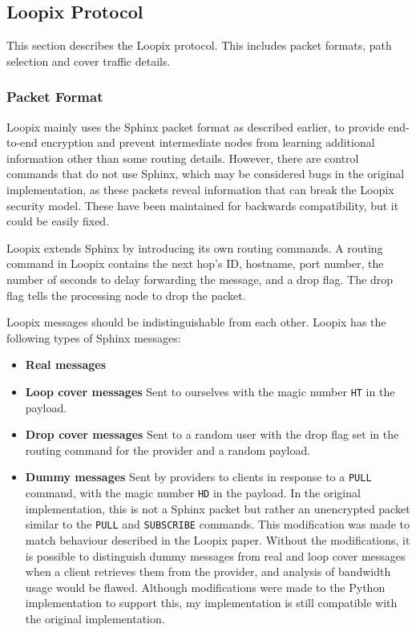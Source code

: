 \documentclass[final,dissertation.tex]{subfiles}
\begin{document}
%

\subsection{Loopix Protocol}

This section describes the Loopix protocol. This includes packet formats, path selection and cover traffic details.

\subsubsection{Packet Format}

Loopix mainly uses the Sphinx packet format as described earlier, to provide end-to-end encryption and prevent intermediate nodes from learning additional information other than some routing details. However, there are control commands that do not use Sphinx, which may be considered bugs in the original implementation, as these packets reveal information that can break the Loopix security model. These have been maintained for backwards compatibility, but it could be easily fixed.

Loopix extends Sphinx by introducing its own routing commands. A routing command in Loopix contains the next hop's ID, hostname, port number, the number of seconds to delay forwarding the message, and a drop flag. The drop flag tells the processing node to drop the packet.

Loopix messages should be indistinguishable from each other. Loopix has the following types of Sphinx messages: 

\begin{itemize}
	\item \textbf{Real messages}
	\item \textbf{Loop cover messages} Sent to ourselves with the magic number \verb|HT| in the payload.
	\item \textbf{Drop cover messages} Sent to a random user with the drop flag set in the routing command for the provider and a random payload.
	\item \textbf{Dummy messages} Sent by providers to clients in response to a \verb|PULL| command, with the magic number \verb|HD| in the payload. In the original implementation, this is not a Sphinx packet but rather an unencrypted packet similar to the \verb|PULL| and \verb|SUBSCRIBE| commands. This modification was made to match behaviour described in the Loopix paper. Without the modifications, it is possible to distinguish dummy messages from real and loop cover messages when a client retrieves them from the provider, and analysis of bandwidth usage would be flawed. Although modifications were made to the Python implementation to support this, my implementation is still compatible with the original implementation.
\end{itemize}
\end{document}
